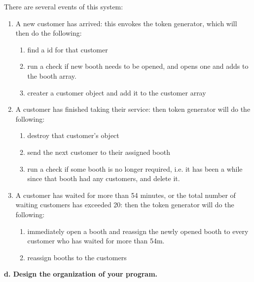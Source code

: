 \documentclass[article, 12pt, a4paper]{memoir}
\begin{document}
\begin{solution}
    [c]
    There are several events of this system:
    \begin{enumerate}[left=0pt]
        \item A new customer has arrived: this envokes the token generator, which will
            then do the following:
            \begin{enumerate}
                \item find a id for that customer
                \item run a check if new booth needs to be opened, and opens one and adds
                    to the booth array.
                \item creater a customer object and add it to the customer array
            \end{enumerate}
        \item A customer has finished taking their service: then token generator will do
            the following:
            \begin{enumerate}
                \item destroy that customer's object
                \item send the next customer to their assigned booth
                \item run a check if some booth is no longer required, i.e. it has been a
                    while since that booth had any customers, and delete it.
            \end{enumerate}
        \item A customer has waited for more than 54 minutes, or the total number of
            waiting customers has exceeded 20: then the token generator will do the
            following:
            \begin{enumerate}
                \item immediately open a booth and reassign the newly opened booth to
                    every customer who has waited for more than 54m.
                \item reassign booths to the customers
            \end{enumerate}
    \end{enumerate}
\end{solution}

\textbf{d. Design the organization of your program.}
\vspace{1em}
\end{document}
